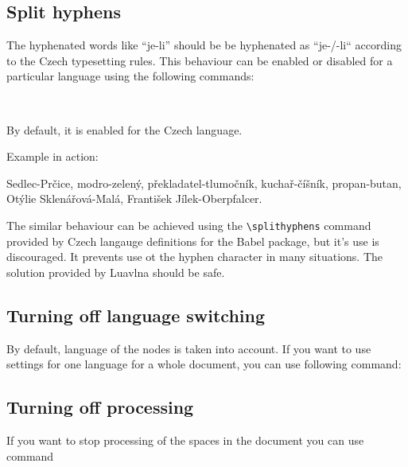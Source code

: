 \documentclass[12pt]{ltxdoc}
\newenvironment{mycode}{
	\medskip%
	\parindent=0pt%
}{\medskip}
\begin{document}
\subsection{Split hyphens}

The hyphenated words like ``je-li'' should be be hyphenated as ``je-/-li``
according to the Czech typesetting rules. This behaviour can be enabled or disabled for a particular
language using the following commands:

\begin{mycode}
  \cmd{\enablesplithyphens}\\
  \cmd{\disablesplithyphens}
\end{mycode}

By default, it is enabled for the Czech language.

Example in action:

\begin{minipage}{3in}
   Sedlec-Prčice, modro-zelený,  překladatel-tlumočník, kuchař-číšník, propan-butan,                                                                                          
   Otýlie Sklenářová-Malá, František Jílek-Oberpfalcer.
\end{minipage}

The similar behaviour can be achieved using the \verb|\splithyphens|  command
provided by Czech langauge definitions for the Babel package, but it's use is
discouraged. It prevents use ot the hyphen character in many situations. The
solution provided by Luavlna should be safe.


\subsection{Turning off language switching}

By default, language of the nodes is taken into account. If you want to use
settings for one language for a whole document, you can use following command:

\begin{mycode}
\cmd{\preventsinglelang}
\end{mycode}

\subsection{Turning off processing}

If you want to stop processing of the spaces in the document you can use command
\end{document}
